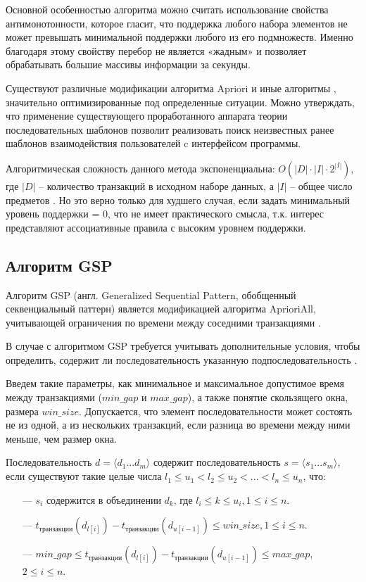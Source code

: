 Основной особенностью алгоритма можно считать использование свойства антимонотонности, которое гласит, что поддержка любого набора элементов не может превышать минимальной поддержки любого из его подмножеств. Именно благодаря этому свойству перебор не является «жадным» и позволяет обрабатывать большие массивы информации за секунды.

Существуют различные модификации алгоритма Apriori и иные алгоритмы \cite{35}, значительно оптимизированные под определенные ситуации. Можно утверждать, что применение существующего проработанного аппарата теории последовательных шаблонов позволит реализовать поиск неизвестных ранее шаблонов взаимодействия пользователей c интерфейсом программы.

Алгоритмическая сложность данного метода экспоненциальна: $O(|D| \cdot |I| \cdot 2^{|I|})$, где $|D|$ -- количество транзакций в исходном наборе данных, а $|I|$ -- общее число предметов \cite{Data_mining_book}. Но это верно только для худшего случая, если задать минимальный уровень поддержки = 0, что не имеет практического смысла, т.к. интерес представляют ассоциативные правила с высоким уровнем поддержки.

\subsection{Алгоритм GSP}
Алгоритм GSP (англ. Generalized Sequential Pattern, обобщенный секвенциальный паттерн) является модификацией алгоритма AprioriAll, учитывающей ограничения по времени между соседними транзакциями \cite{1_, 32_}.

В случае с алгоритмом GSP требуется учитывать дополнительные условия, чтобы определить, содержит ли последовательность указанную подпоследовательность \cite{gsp}.

Введем такие параметры, как минимальное и максимальное допустимое время между транзакциями ($min\_gap$ и $max\_gap$), а также понятие скользящего окна, размера $win\_size$. Допускается, что элемент последовательности может состоять не из одной, а из нескольких транзакций, если разница во времени между ними меньше, чем размер окна.

Последовательность $d = \langle d_1...d_m \rangle$ содержит последовательность
$s = \langle s_1...s_m \rangle$, если существуют такие целые числа $l_1 ≤ u_1 < l_2 ≤ u_2 < ... < l_n ≤ u_n$, что:

\begin{enumerate}
	\item[---] $s_i$ содержится в объединении $d_k$, где $l_i ≤ k ≤ u_i, 1 ≤ i ≤ n$.
	\item[---] $t_{\text{транзакции}}(d_{l[i]}) - t_{\text{транзакции}} (d_{u[i-1]}) ≤ win\_size, 1 ≤ i ≤ n.$
	\item[---] $min\_gap ≤ t_{\text{транзакции}}(d_{l[i]}) - t_{\text{транзакции}}(d_{u[i-1]}) ≤ max\_gap,$ \newline $2≤i≤n.$
\end{enumerate}

